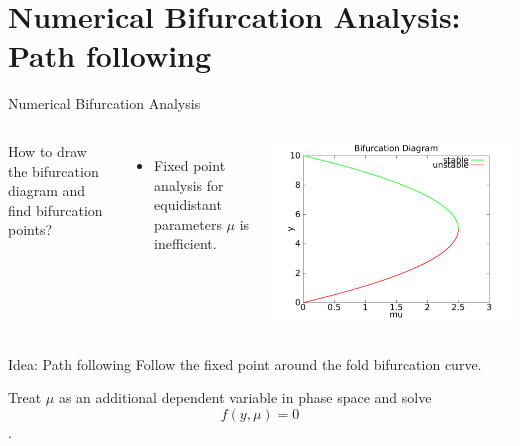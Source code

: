 \documentclass{beamer}
\begin{document}
\section{Numerical Bifurcation Analysis: Path following}
\begin{frame}{Numerical Bifurcation Analysis}
    \begin{columns}
        \begin{block}{}
            How to draw the bifurcation diagram and find bifurcation points?
        \end{block}
        \begin{itemize}
            \item Fixed point analysis for equidistant parameters $\mu$ is inefficient.
        \end{itemize}
        \includegraphics[width=\textwidth]{grafik/harvesting}
    \end{columns}
    
    \pause
    \begin{block}{Idea: Path following}
        Follow the fixed point around the fold bifurcation curve.
    \end{block}
    
    Treat $\mu$ as an additional dependent variable in phase space and solve 
    $$f(y, \mu) = 0$$. 
    
\end{frame}
\end{document}
